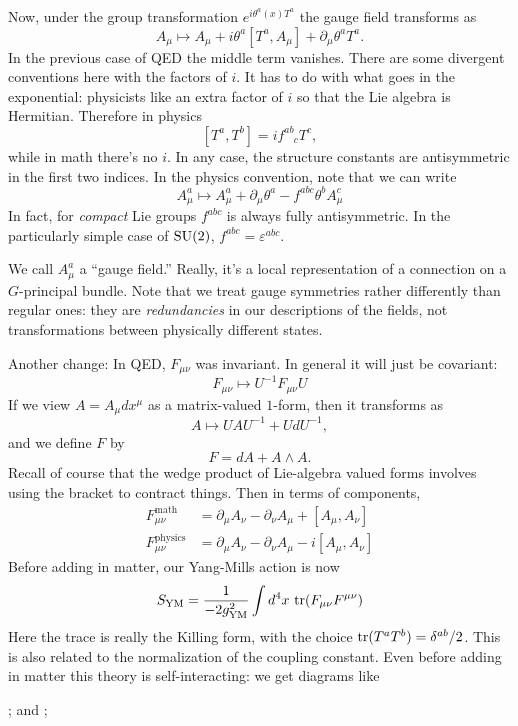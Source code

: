 Now, under the group transformation $e^{i \theta^a(x) T^a}$ the gauge field transforms as
\[
A_\mu \mapsto A_\mu + i \theta^a [T^a, A_\mu] + \partial_\mu \theta^a T^a.
\]
In the previous case of QED the middle term vanishes.
There are some divergent conventions here with the factors of $i$.
It has to do with what goes in the exponential: physicists like an extra factor of $i$ so that the Lie algebra is Hermitian.
Therefore in physics
\[
[T^a, T^b] = i f^{ab}_{\phantom{ab}c} T^c,
\]
while in math there's no $i$.
In any case, the structure constants are antisymmetric in the first two indices.
In the physics convention, note that we can write
\[
A_\mu^a \mapsto A_\mu^a + \partial_\mu \theta^a - f^{abc} \theta^b A_\mu^c
\]
In fact, for \emph{compact} Lie groups $f^{abc}$ is always fully antisymmetric.
In the particularly simple case of $\operatorname{SU}(2)$, $f^{abc} = \varepsilon^{abc}$.

We call $A_\mu^a$ a ``gauge field.''
Really, it's a local representation of a connection on a $G$-principal bundle.
Note that we treat gauge symmetries rather differently than regular ones: they are \emph{redundancies} in our descriptions of the fields, not transformations between physically different states.

Another change: In QED, $F_{\mu \nu}$ was invariant.
In general it will just be covariant:
\[
F_{\mu \nu} \mapsto U^{-1}F_{\mu \nu} U
\]
If we view $A = A_\mu dx^\mu$ as a matrix-valued $1$-form, then it transforms as
\[
A \mapsto U AU^{-1} + U dU^{-1},
\]
and we define $F$ by
\[
F = dA + A \wedge A.
\]
Recall of course that the wedge product of Lie-algebra valued forms involves using the bracket to contract things.
Then in terms of components,
\begin{align*}
F^{\text{math}}_{\mu \nu} &= \partial_\mu A_\nu - \partial_\nu A_\mu + [A_\mu, A_\nu]\\
F^{\text{physics}}_{\mu \nu} &= \partial_\mu A_\nu - \partial_\nu A_\mu - i[A_\mu, A_\nu]
\end{align*}
Before adding in matter, our Yang-Mills action is now
\[
S_{\text{YM}} = \frac{1}{-2g^2_{\text{YM}}} \int d^4x\, \operatorname{tr}(F_{\mu \nu} F^{\mu \nu})
\]
Here the trace is really the Killing form, with the choice $\operatorname{tr}(T^a T^b) = \delta^{ab}/2$.
This is also related to the normalization of the coupling constant.
Even before adding in matter this theory is self-interacting: we get diagrams like
\begin{center}
;
and 
;
\end{center}

